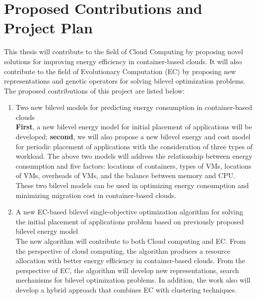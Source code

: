 \chapter{Proposed Contributions and Project Plan}\label{C:con}

This thesis will contribute to the field of Cloud Computing by proposing novel solutions for improving energy efficiency in container-based clouds. It will also contribute to the field of Evolutionary Computation (EC) by proposing new representations and genetic operators for solving bilevel optimization problems. The proposed contributions of this project are listed below:
 
\begin{enumerate}
	\item Two new bilevel models for predicting energy consumption in container-based clouds \\

	 \textbf{First}, a new bilevel energy model for initial placement of applications will be developed; \textbf{second}, we will also propose a new bilevel energy and cost model for periodic placement of applications with the consideration of three types of workload. The above two models will address the relationship between energy consumption and five factors: locations of containers, types of VMs, locations of VMs, overheads of VMs, and the balance between memory and CPU.  
	These two bilevel models can be used in optimizing energy consumption and minimizing migration cost in container-based clouds.

	\item A new EC-based bilevel single-objective optimization algorithm for solving the initial placement of applications problem based on previously proposed bilevel energy model \\

	The new algorithm will contribute to both Cloud computing and EC. From the perspective of cloud computing, the algorithm produces a resource allocation with better energy efficiency in container-based clouds. From the perspective of EC, the algorithm will develop new representations, search mechanisms for bilevel optimization problems. In addition, the work also will develop a hybrid approach that combines EC with clustering techniques.


\end{enumerate}
